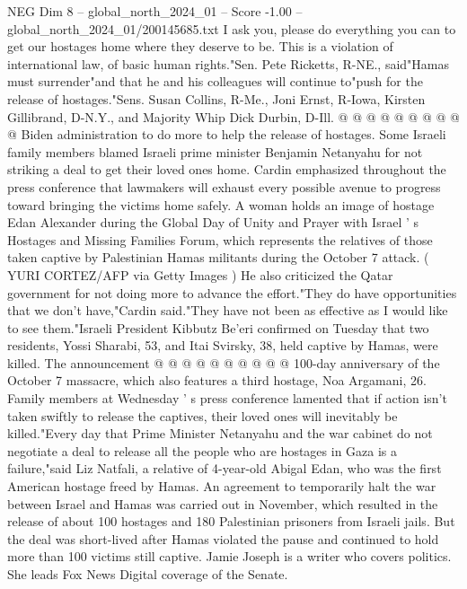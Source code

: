 \begin{textsample}{NEG Dim 8 – global\_north\_2024\_01 – Score -1.00 – global\_north\_2024\_01/200145685.txt}
I ask you, please do everything you can to get our hostages home where they deserve to be.
This is a violation of international law, of basic human rights."Sen.
Pete Ricketts, R-NE., said"Hamas must surrender"and that he and his colleagues will continue to"push for the release of hostages."Sens.
Susan Collins, R-Me., Joni Ernst, R-Iowa, Kirsten Gillibrand, D-N.Y., and Majority Whip Dick Durbin, D-Ill. @ @ @ @ @ @ @ @ @ @ Biden administration to do more to help the release of hostages.
Some Israeli family members blamed Israeli prime minister Benjamin Netanyahu for not striking a deal to get their loved ones home.
Cardin emphasized throughout the press conference that lawmakers will exhaust every possible avenue to progress toward bringing the victims home safely.
A woman holds an image of hostage Edan Alexander during the Global Day of Unity and Prayer with Israel ' s Hostages and Missing Families Forum, which represents the relatives of those taken captive by Palestinian Hamas militants during the October 7 attack. ( YURI CORTEZ/AFP via Getty Images ) He also criticized the Qatar government for not doing more to advance the effort."They do have opportunities that we don't have,"Cardin said."They have not been as effective as I would like to see them."Israeli President Kibbutz Be'eri confirmed on Tuesday that two residents, Yossi Sharabi, 53, and Itai Svirsky, 38, held captive by Hamas, were killed.
The announcement @ @ @ @ @ @ @ @ @ @ 100-day anniversary of the October 7 massacre, which also features a third hostage, Noa Argamani, 26.
Family members at Wednesday ' s press conference lamented that if action isn't taken swiftly to release the captives, their loved ones will inevitably be killed."Every day that Prime Minister Netanyahu and the war cabinet do not negotiate a deal to release all the people who are hostages in Gaza is a failure,"said Liz Natfali, a relative of 4-year-old Abigal Edan, who was the first American hostage freed by Hamas.
An agreement to temporarily halt the war between Israel and Hamas was carried out in November, which resulted in the release of about 100 hostages and 180 Palestinian prisoners from Israeli jails.
But the deal was short-lived after Hamas violated the pause and continued to hold more than 100 victims still captive.
Jamie Joseph is a writer who covers politics.
She leads Fox News Digital coverage of the Senate.

\end{textsample}
